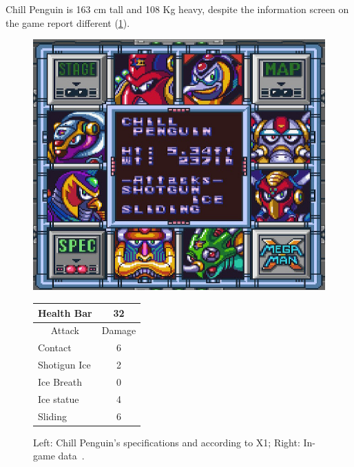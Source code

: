 Chill Penguin is 163 cm tall and 108 Kg heavy, despite the information screen on the game report different (\ref{Penguin_specs}).

\begin{figure}[htp]
	\begin{minipage}[c]{0.45\linewidth}
		\vspace{0pt}
		\centering
		\includegraphics[width=\linewidth]{figures/X1/Chill_penguin/Chill_penguin_specs.jpg}
	\end{minipage}
	\begin{minipage}[c]{0.45\linewidth}
		\centering
		\vspace{0pt}
		\begin{tabular}[h]{l c}
			\toprule
			Health Bar & 32\\
			\midrule
			\multicolumn{1}{c}{Attack} & \multicolumn{1}{c}{Damage}\\
			Contact & 6\\
			Shotigun Ice & 2\\
			Ice Breath & 0\\
			Ice statue & 4\\
			Sliding & 6\\
			\bottomrule
		\end{tabular}
	\end{minipage}
	\caption{Left: Chill Penguin's specifications and according to X1; Right: In-game data~\cite{wiki:Chill_Penguin}. }
	\label{Penguin_specs}
\end{figure}


